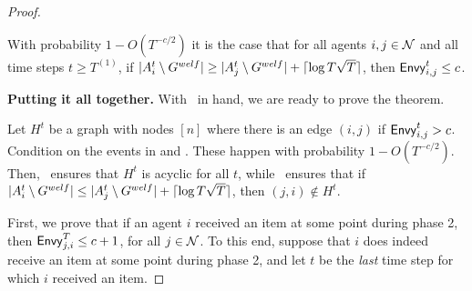 \begin{proof}

    \begin{lemma}\label{lem:high-value-n} With probability $1 - O(T^{-c/2})$ it is the case that for all agents $i, j \in \mathcal{N}$ and all time steps $t \ge T^{(1)}$, if $|A^t_i \setminus G^{welf}| \ge |A^t_j \setminus G^{welf}| + \lceil\log T \sqrt{T}\rceil$, then $\mathsf{Envy}^t_{i, j} \le c$. 
    \end{lemma}


    \textbf{Putting it all together.}
    With~ in hand, we are ready to prove the theorem.
    
    Let $H^t$ be a graph with nodes $[n]$ where there is an edge $(i, j)$ if $\mathsf{Envy}^t_{i, j} > c$. Condition on the events in  and . %
    These happen with probability $1 - O(T^{-c/2})$. Then,~ ensures that $H^t$ is acyclic for all $t$, while~ ensures that if $|A^t_i \setminus G^{welf}| \le  |A^t_j \setminus G^{welf}| + \lceil\log T \sqrt{T}\rceil$, then $(j, i) \notin H^t$.%


    First, we prove that if an agent $i$ received an item at some point during phase 2, then $\mathsf{Envy}^T_{j, i} \le c + 1$, for all $j \in \mathcal{N}$. To this end, suppose that $i$ does indeed receive an item at some point during phase 2, and let $t$ be the \emph{last} time step for which $i$ received an item. 


\end{proof}
